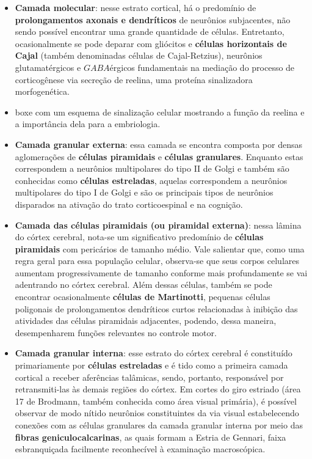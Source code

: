 \documentclass[
]{book}
\theoremstyle{definition}
\theoremstyle{definition}
\theoremstyle{definition}
\theoremstyle{definition}
\theoremstyle{remark}
\begin{document}
\begin{itemize}
\item
  \textbf{Camada molecular}: nesse estrato cortical, há o predomínio de \textbf{prolongamentos axonais e dendríticos} de neurônios subjacentes, não sendo possível encontrar uma grande quantidade de células. Entretanto, ocasionalmente se pode deparar com gliócitos e \textbf{células horizontais de Cajal} (também denominadas células de Cajal-Retzius), neurônios glutamatérgicos e \(GABA\)érgicos fundamentais na mediação do processo de corticogênese via secreção de reelina, uma proteína sinalizadora morfogenética.
\item
  boxe com um esquema de sinalização celular mostrando a função da reelina e a importância dela para a embriologia.
\item
  \textbf{Camada granular externa}: essa camada se encontra composta por densas aglomerações de \textbf{células piramidais} e \textbf{células granulares}. Enquanto estas correspondem a neurônios multipolares do tipo II de Golgi e também são conhecidas como \textbf{células estreladas}, aquelas correspondem a neurônios multipolares do tipo I de Golgi e são os principais tipos de neurônios disparados na ativação do trato corticoespinal e na cognição.
\item
  \textbf{Camada das células piramidais (ou piramidal externa)}: nessa lâmina do córtex cerebral, nota-se um significativo predomínio de \textbf{células piramidais} com pericários de tamanho médio. Vale salientar que, como uma regra geral para essa população celular, observa-se que seus corpos celulares aumentam progressivamente de tamanho conforme mais profundamente se vai adentrando no córtex cerebral. Além dessas células, também se pode encontrar ocasionalmente \textbf{células de Martinotti}, pequenas células poligonais de prolongamentos dendríticos curtos relacionadas à inibição das atividades das células piramidais adjacentes, podendo, dessa maneira, desempenharem funções relevantes no controle motor.
\item
  \textbf{Camada granular interna}: esse estrato do córtex cerebral é constituído primariamente por \textbf{células estreladas} e é tido como a primeira camada cortical a receber aferências talâmicas, sendo, portanto, responsável por retransmiti-las às demais regiões do córtex. Em cortes do giro estriado (área 17 de Brodmann, também conhecida como área visual primária), é possível observar de modo nítido neurônios constituintes da via visual estabelecendo conexões com as células granulares da camada granular interna por meio das \textbf{fibras geniculocalcarinas}, as quais formam a Estria de Gennari, faixa esbranquiçada facilmente reconhecível à examinação macroscópica.

\end{itemize}
\end{document}
